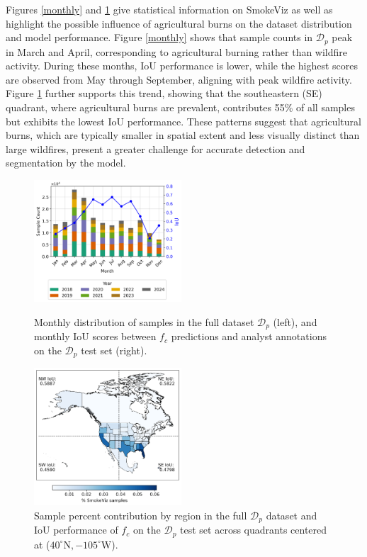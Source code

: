\documentclass{article}
\begin{document}
Figures \ref{monthly} and \ref{region} give statistical information on SmokeViz as well as highlight the possible influence of agricultural burns on the dataset distribution and model performance. Figure \ref{monthly} shows that sample counts in \(\mathcal{D}_p\) peak in March and April, corresponding to agricultural burning rather than wildfire activity. During these months, IoU performance is lower, while the highest scores are observed from May through September, aligning with peak wildfire activity. Figure \ref{region} further supports this trend, showing that the southeastern (SE) quadrant, where agricultural burns are prevalent, contributes 55\% of all samples but exhibits the lowest IoU performance. These patterns suggest that agricultural burns, which are typically smaller in spatial extent and less visually distinct than large wildfires, present a greater challenge for accurate detection and segmentation by the model.

\begin{figure}[!htb]
    \parbox{\textwidth}{
      \parbox{0.49\textwidth}{
        \centering
        \includegraphics[width=0.49\textwidth]{figures/combined_plot.png}
        \caption{Monthly distribution of samples in the full dataset \( \mathcal{D}_p \) (left), and monthly IoU scores between \(f_c\) predictions and analyst annotations on the \(\mathcal{D}_p\) test set (right).}
        \label{monthly}
      }
    \hspace{0.01\textwidth}
      \parbox{0.49\textwidth}{
        \centering
        \includegraphics[width=0.49\textwidth]{figures/sample_count_per_state_with_regions.png}
        \caption{Sample percent contribution by region in the full \( \mathcal{D}_p \) dataset and IoU performance of \(f_c\) on the \(\mathcal{D}_p\) test set across quadrants centered at (\(40^{\circ}\text{N}, -105^{\circ}\text{W}\)).}
          \label{region}
      }
    }
\end{figure}
\end{document}
